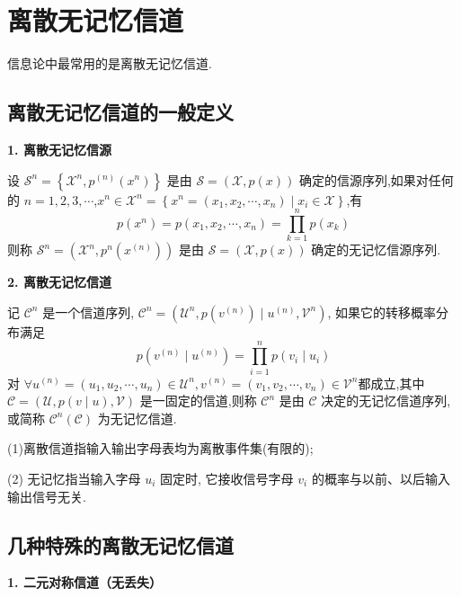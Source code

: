 \section{离散无记忆信道}

信息论中最常用的是离散无记忆信道.

\subsection{离散无记忆信道的一般定义}

\textbf{1. 离散无记忆信源}

设 $ \mathscr{S}^{n}=\left\{\mathscr{X}^{n}, p^{(n)}\left(x^{n}\right)\right\} $ 是由 $ \mathscr{S}=(\mathscr{X}, p(x)) $ 确定的信源序列,如果对任何的 $ n=1,2,3, \cdots $,$x^{n} \in \mathscr{X}^{n}=\left\{x^{n}=\left(x_{1}, x_{2}, \cdots, x_{n}\right) \mid x_{i} \in \mathscr{X}\right\}$,有
$$
p\left(x^{n}\right)=p\left(x_{1}, x_{2}, \cdots, x_{n}\right)=\prod_{k=1}^{n} p\left(x_{k}\right)
$$
则称 $ \mathscr{S}^{n}=\left(\mathscr{X}^{n}, p^{n}\left(x^{(n)}\right)\right) $ 是由 $ \mathscr{S}=(\mathscr{X}, p(x)) $ 确定的无记忆信源序列.

\textbf{2. 离散无记忆信道}

记 $ \mathscr{C}^{n} $ 是一个信道序列, $ \mathscr{C}^{n}=\left(\mathscr{U}^{n}, p\left(v^{(n)}\right) \mid u^{(n)}, \mathscr{V}^{n}\right) $, 如果它的转移概率分布满足
$$
p\left(v^{(n)} \mid u^{(n)}\right)=\prod_{i=1}^{n} p\left(v_{i} \mid u_{i}\right)
$$
对 $ \forall u^{(n)}=\left(u_{1}, u_{2}, \cdots, u_{n}\right) \in \mathscr{U}^{n}, v^{(n)}=\left(v_{1}, v_{2}, \cdots, v_{n}\right) \in \mathscr{V}^{n} $都成立,其中 $ \mathscr{C}=(\mathscr{U}, p(v \mid u), \mathscr{V}) $ 是一固定的信道,则称 $ \mathscr{C}^{n} $ 是由 $ \mathscr{C} $ 决定的无记忆信道序列,或简称 $ \mathscr{C}^{n}(\mathscr{C}) $ 为无记忆信道.

\begin{remark}

    (1)离散信道指输入输出字母表均为离散事件集(有限的);

    (2) 无记忆指当输入字母 $ u_{i} $ 固定时, 它接收信号字母 $ v_{i} $ 的概率与以前、以后输入输出信号无关.
\end{remark}


\subsection{几种特殊的离散无记忆信道}

\textbf{1. 二元对称信道（无丢失）}

